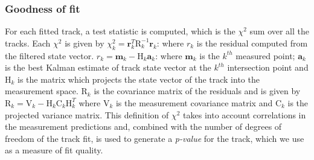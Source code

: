     \subsubsection{Goodness of fit}
    For each fitted track, a test statistic is computed, which is the $\chi^2$ sum over all the tracks. Each $\chi^2$ is given by $\chi_{k}^{2}=\mathbf{r}_{k}^{T}\mathrm{R}_{k}^{-1}\mathbf{r}_{k}$: where $r_{k}$ is the residual computed from the filtered state vector. $r_{k}=\mathbf{m}_{k}-\mathrm{H}_{k}\mathbf{a}_{k}$: where $\mathbf{m}_{k}$ is the $k^{th}$  measured point; $\mathbf{a}_{k}$ is the best Kalman estimate of track state vector at the $k^{th}$ intersection point and $\mathrm{H}_{k}$ is the matrix which projects the state vector of the track into the measurement space. $\mathrm{R}_{k}$ is the covariance matrix of the residuals and is given by  $\mathrm{R}_{k}=\mathrm{V}_{k}-\mathrm{H}_{k}\mathrm{C}_{k}\mathrm{H}_{k}^{T}$ where $\mathrm{V}_{k}$ is the measurement covariance matrix and $\mathrm{C}_{k}$ is the projected variance matrix. This definition of  $\chi^{2}$  takes into account correlations in the measurement predictions and, combined with the number of degrees of freedom of the track fit, is used to generate a {\it p-value} for the track, which we use as a measure of fit quality.





  